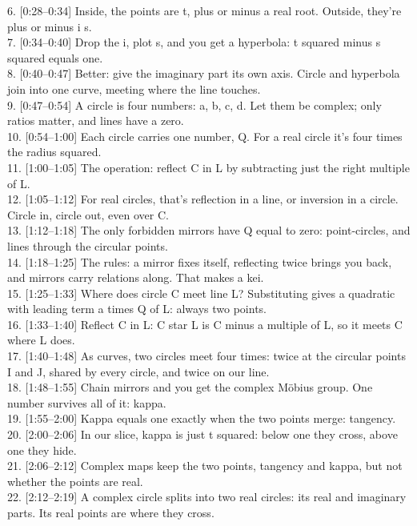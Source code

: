 \documentclass[10pt]{article}
\begin{document}
6. [0:28--0:34] Inside, the points are t, plus or minus a real root. Outside, they're plus or minus i s.\\
7. [0:34--0:40] Drop the i, plot s, and you get a hyperbola: t squared minus s squared equals one.\\
8. [0:40--0:47] Better: give the imaginary part its own axis. Circle and hyperbola join into one curve, meeting where the line touches.\\
9. [0:47--0:54] A circle is four numbers: a, b, c, d. Let them be complex; only ratios matter, and lines have a zero.\\
10. [0:54--1:00] Each circle carries one number, Q. For a real circle it's four times the radius squared.\\
11. [1:00--1:05] The operation: reflect C in L by subtracting just the right multiple of L.\\
12. [1:05--1:12] For real circles, that's reflection in a line, or inversion in a circle. Circle in, circle out, even over C.\\
13. [1:12--1:18] The only forbidden mirrors have Q equal to zero: point-circles, and lines through the circular points.\\
14. [1:18--1:25] The rules: a mirror fixes itself, reflecting twice brings you back, and mirrors carry relations along. That makes a kei.\\
15. [1:25--1:33] Where does circle C meet line L? Substituting gives a quadratic with leading term a times Q of L: always two points.\\
16. [1:33--1:40] Reflect C in L: C star L is C minus a multiple of L, so it meets C where L does.\\
17. [1:40--1:48] As curves, two circles meet four times: twice at the circular points I and J, shared by every circle, and twice on our line.\\
18. [1:48--1:55] Chain mirrors and you get the complex Möbius group. One number survives all of it: kappa.\\
19. [1:55--2:00] Kappa equals one exactly when the two points merge: tangency.\\
20. [2:00--2:06] In our slice, kappa is just t squared: below one they cross, above one they hide.\\
21. [2:06--2:12] Complex maps keep the two points, tangency and kappa, but not whether the points are real.\\
22. [2:12--2:19] A complex circle splits into two real circles: its real and imaginary parts. Its real points are where they cross.\\
\end{document}
